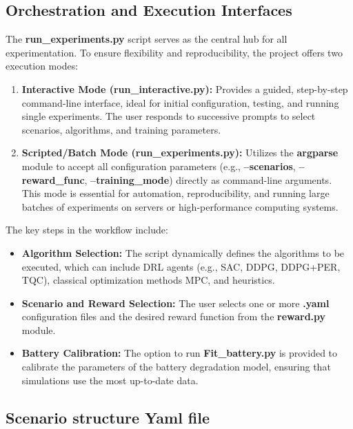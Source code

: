 \subsection{Orchestration and Execution Interfaces}

The \textbf{run\_experiments.py} script serves as the central hub for all experimentation. To ensure flexibility and reproducibility, the project offers two execution modes:

\begin{enumerate}
    \item \textbf{Interactive Mode (\textbf{run\_interactive.py}):} Provides a guided, step-by-step command-line interface, ideal for initial configuration, testing, and running single experiments. The user responds to successive prompts to select scenarios, algorithms, and training parameters.
    \item \textbf{Scripted/Batch Mode (\textbf{run\_experiments.py}):} Utilizes the \textbf{argparse} module to accept all configuration parameters (e.g., \textbf{--scenarios}, \textbf{--reward\_func}, \textbf{--training\_mode}) directly as command-line arguments. This mode is essential for automation, reproducibility, and running large batches of experiments on servers or high-performance computing systems.
\end{enumerate}

The key steps in the workflow include:

\begin{itemize}
    \item \textbf{Algorithm Selection:} The script dynamically defines the algorithms to be executed, which can include DRL agents (e.g., SAC, DDPG, DDPG+PER, TQC), classical optimization methods MPC, and heuristics.
    \item \textbf{Scenario and Reward Selection:} The user selects one or more \textbf{.yaml} configuration files and the desired reward function from the \textbf{reward.py} module.
    \item \textbf{Battery Calibration:} The option to run \textbf{Fit\_battery.py} is provided to calibrate the parameters of the battery degradation model, ensuring that simulations use the most up-to-date data.
\end{itemize}

\subsection{Scenario structure Yaml file}

